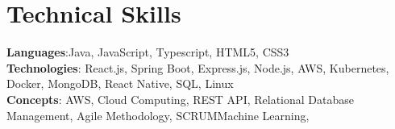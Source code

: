 \section{Technical Skills}
    \begin{itemize}[leftmargin=0.15in, label={}]
	\small{\item{
		\textbf{Languages}{:Java, JavaScript, Typescript, HTML5, CSS3} \\
		\textbf{Technologies}{: React.js, Spring Boot, Express.js, Node.js, AWS, Kubernetes, Docker, MongoDB, React Native, SQL, Linux} \\
		\textbf{Concepts}{: AWS,  Cloud Computing, REST API, Relational Database Management, Agile Methodology, SCRUMMachine Learning, }
	}}
    \end{itemize}
